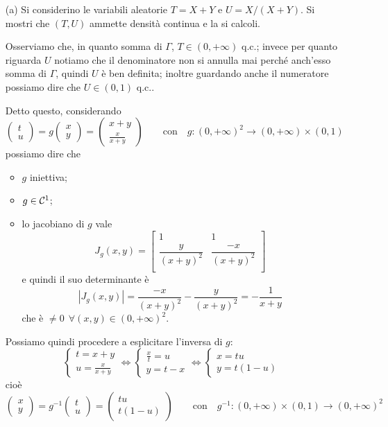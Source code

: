 \Soluzione{} %
\begin{enumerate}
\item [(a)] Si considerino le variabili aleatorie $T=X+Y$ e $U=X/(X+Y)$. Si mostri che $(T,U)$ ammette densità continua e la si calcoli.

Osserviamo che, in quanto somma di $\Gamma$, $T\in(0,+\infty)$ q.c.; invece per quanto riguarda $U$ notiamo che il denominatore non si annulla mai perché anch'esso somma di $\Gamma$, quindi $U$ è ben definita; inoltre guardando anche il numeratore possiamo dire che $U\in(0,1)$ q.c..

Detto questo, considerando
\[
\begin{pmatrix}
t \\ u
\end{pmatrix}=g\begin{pmatrix}
x \\ y
\end{pmatrix}=\begin{pmatrix}
x+y \\ \frac{x}{x+y}
\end{pmatrix}
\qquad\text{con}\quad g:(0,+\infty)^2\to(0,+\infty)\times (0,1)
\]
possiamo dire che
\begin{itemize}
\item $g$ iniettiva;
\item $g\in\mathcal{C}^1$;
\item lo jacobiano di $g$ vale
\[
J_g(x,y)=\begin{bmatrix}
 1& 1 \\
 \dfrac{y}{(x+y)^2}& \dfrac{-x}{(x+y)^2} \\
\end{bmatrix}
\]
e quindi il suo determinante è
\[
|J_g(x,y)|=\dfrac{-x}{(x+y)^2}-\dfrac{y}{(x+y)^2}=-\dfrac{1}{x+y}
\]
che è $\neq 0\ \ \forall(x,y)\in(0,+\infty)^2$.
\end{itemize}
Possiamo quindi procedere a esplicitare l'inversa di $g$:
\[
\begin{cases}t=x+y\\u=\frac{x}{x+y}\end{cases}
\iff
\begin{cases}\frac{x}{t}=u\\y=t-x\end{cases}
\iff
\begin{cases}x=tu\\y=t(1-u)\end{cases}
\]
cioè
\[
\begin{pmatrix}
x \\ y
\end{pmatrix}=g^{-1}\begin{pmatrix}
t \\ u
\end{pmatrix}=\begin{pmatrix}
tu \\ t(1-u)
\end{pmatrix}
\qquad\text{con}\quad g^{-1}:(0,+\infty)\times (0,1)\to(0,+\infty)^2
\]


\end{enumerate}
